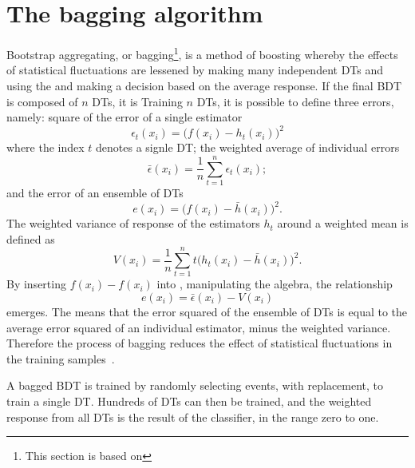 \section{The bagging algorithm}
\label{sec:bdt:bag}
Bootstrap aggregating, or bagging\footnote{
  This section is based on }, is a method of boosting whereby the effects of
statistical fluctuations are lessened by making many independent DTs and using the
and making a decision based on the average response.
If the final BDT is composed of $n$ DTs, it is
Training $n$ DTs, it is possible to define three errors, namely:
square of the error of a single estimator
\begin{equation}
  \epsilon_t(x_i) = \big(f(x_i)-h_t(x_i)\big)^2
  \label{eq:bdt:bag1}
\end{equation}
where the index $t$ denotes a signle DT;
the weighted average of individual errors
\begin{equation}
  \bar\epsilon(x_i) = \frac1n\sum_{t=1}^n\epsilon_t(x_i);
  \label{eq:bdt:bag2}
\end{equation}
and the error of an ensemble of DTs
\begin{equation}
  e(x_i) = \big(f(x_i)-\bar h(x_i)\big)^2.
  \label{eq:bdt:bag3}
\end{equation}
The weighted variance of response of the estimators $h_t$ around a weighted mean is defined as
\begin{equation}
  V(x_i) = \frac1n\sum_{t=1}^nt\big(h_t(x_i) - \bar h(x_i)\big)^2.
  \label{eq:bdt:bag4}
\end{equation}
By inserting $f(x_i)-f(x_i)$ into , manipulating the algebra, the relationship
\begin{equation}
  e(x_i) = \bar\epsilon(x_i) - V(x_i)
  \label{eq:bdt:bag5}
\end{equation}
emerges.
The means that the error squared of the ensemble of DTs is equal to the average error squared of an
individual estimator, minus the weighted variance.
Therefore the process of bagging reduces the
effect of statistical fluctuations in the training samples~\cite{Krogh95neuralnetwork}.

A bagged BDT is trained by randomly selecting events, with replacement, to train a single DT.
Hundreds of DTs can then be trained, and the weighted response from all DTs is the result of the
classifier, in the range zero to one.





